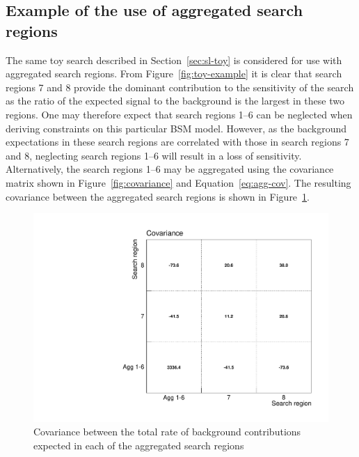 \subsection{Example of the use of aggregated search regions}
\label{sec:agg-toy}

The same toy search described in Section~\ref{sec:sl-toy} is considered for use with aggregated search regions. 
From Figure~\ref{fig:toy-example} it is clear that search regions 7 and 8  provide the dominant contribution to 
the sensitivity of the search as the ratio of the expected signal to the background is the largest in these two regions. 
One may therefore expect that search regions 1--6 can be neglected when deriving constraints on this particular BSM model. 
However, as the background expectations in these search regions are correlated with those in search regions 7 and 8, neglecting search regions 1--6 
will result in a loss of sensitivity.  
Alternatively, the search regions 1--6 may be aggregated using the covariance matrix shown in 
Figure~\ref{fig:covariance} and Equation~\ref{eq:agg-cov}. The resulting covariance
between the aggregated search regions is shown in Figure~\ref{fig:agg-covariance}.

\begin{figure}[hbt]
  \begin{center} 
   \includegraphics[width=1.5\cmsFigWidth]{figures/agg_htsearch_covariance.pdf}
   \caption{Covariance between the total rate of background contributions expected in each of the aggregated search regions}
   \label{fig:agg-covariance} 
  \end{center}
\end{figure}

